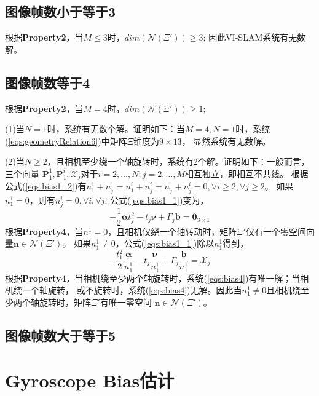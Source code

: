 \documentclass{article}
\begin{document}
\subsection{图像帧数小于等于3}
根据\textbf{Property2}，当$M\leqslant 3$时，$dim(\mathcal{N}(\Xi'))\geqslant 3$;
因此VI-SLAM系统有无数解。

\subsection{图像帧数等于4}
根据\textbf{Property2}，当$M=4$时，$dim(\mathcal{N}(\Xi'))\geqslant 1$; 
\par
(1)当$N=1$时，系统有无数个解。证明如下：当$M=4,N=1$时，系统(\ref{eqs:geometryRelation6})中矩阵$\Xi$维度为$9\times 13$，
显然系统有无数解。
\par
(2)当$N\geqslant 2$，且相机至少绕一个轴旋转时，系统有2个解。证明如下：一般而言，三个向量
$\textbf{P}_1^1,\textbf{P}_1^i,\mathcal{X}_j$对于$i=2,\dots,N; j=2,\dots,M$相互独立，即相互不共线。
根据公式(\ref{eqs:bias1_2})有$n_1^1+n_j^1=n_1^i+n_j^i=n_j^1+n_j^i=0,\forall i\geqslant 2,\forall j\geqslant 2$。
如果$n_1^1=0$，则有$n_j^i=0,\forall i,\forall j$; 公式(\ref{eqs:bias1_1})变为，
\begin{equation}
    -\frac{1}{2}\mathbf{\alpha}t_j^2-t_j\mathbf{\nu}+\Gamma_j\textbf{b}=\textbf{0}_{3\times 1}
\end{equation}
根据\textbf{Property4}，当$n_1^1=0$，且相机仅绕一个轴转动时，矩阵$\Xi'$仅有一个零空间向量$\textbf{n}\in\mathcal{N}(\Xi')$。
如果$n_1^1\not=0$，公式(\ref{eqs:bias1_1})除以$n_1^1$得到，
\begin{equation}\label{eqs:bias4}
    -\frac{t_1^2}{2}\frac{\mathbf{\alpha}}{n_1^1}-t_{j}\frac{\mathbf{\nu}}{n_1^1}+\Gamma_{j}\frac{\textbf{b}}{n_1^1}=\mathcal{X}_j
\end{equation}
根据\textbf{Property4}，当相机绕至少两个轴旋转时，系统(\ref{eqs:bias4})有唯一解；当相机绕一个轴旋转，
或不旋转时，系统(\ref{eqs:bias4})无解。因此当$n_1^1\not=0$且相机绕至少两个轴旋转时，矩阵$\Xi'$有唯一零空间
$\textbf{n}\in\mathcal{N}(\Xi')$。


\subsection{图像帧数大于等于5}

\section{Gyroscope Bias估计}
\end{document}
